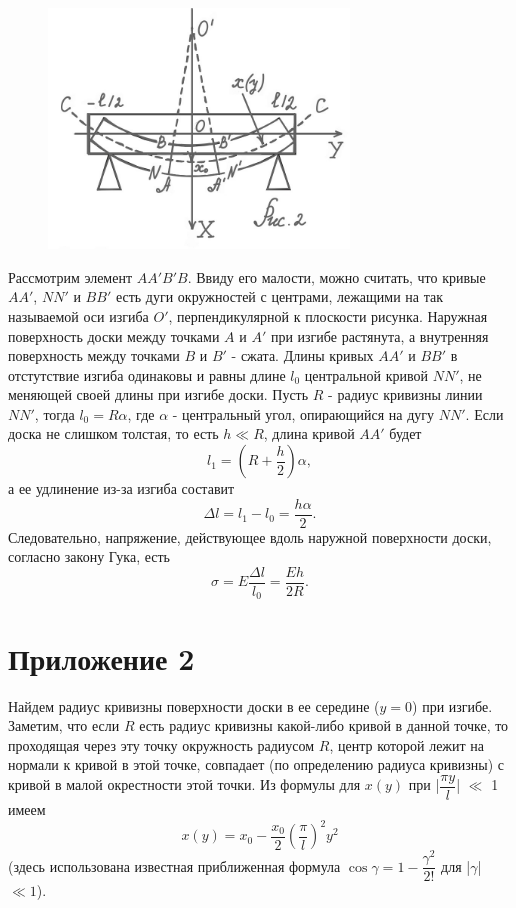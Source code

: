 \documentclass[a4paper,12pt]{article} %
\begin{document}
\begin{figure}
\includegraphics[width=8cm]{pictures/2.PNG}
\label{fig:image}
\end{figure}
Рассмотрим элемент $AA'B'B$. Ввиду его малости, можно считать, что кривые $AA'$, $NN'$ и $BB'$ есть дуги окружностей с центрами, лежащими на так называемой оси изгиба $O'$, перпендикулярной к плоскости рисунка. Наружная поверхность доски между точками $A$ и $A'$ при изгибе растянута, а внутренняя поверхность между точками $B$ и $B'$ - сжата. Длины кривых $AA'$ и $BB'$ в отстутствие изгиба одинаковы и равны длине $l_0$ центральной кривой $NN'$, не меняющей своей длины при изгибе доски. Пусть $R$ - радиус кривизны линии $NN'$, тогда $l_0 = R\alpha$, где $\alpha$ - центральный угол, опирающийся на дугу $NN'$. Если доска не слишком толстая, то есть $h \ll R$, длина кривой $AA'$ будет $$l_1 = \left(R + \dfrac{h}{2}\right)\alpha,$$ а ее удлинение из-за изгиба составит $$\Delta l = l_1 - l_0 = \dfrac{h\alpha}{2}.$$ Следовательно, напряжение, действующее вдоль наружной поверхности доски, согласно закону Гука, есть $$\sigma = E\dfrac{\Delta l}{l_0} = \dfrac{Eh}{2R}.$$

\section*{Приложение 2}

Найдем радиус кривизны поверхности доски в ее середине ($y = 0$) при изгибе. Заметим, что если $R$ есть радиус кривизны какой-либо кривой в данной точке, то проходящая через эту точку окружность радиусом $R$, центр которой лежит на нормали к кривой в этой точке, совпадает (по определению радиуса кривизны) с кривой в малой окрестности этой точки. Из формулы для $x(y)$ при |$\dfrac{\pi y}{l}$| $\ll$ 1 имеем $$x(y) = x_0 - \dfrac{x_0}{2}\left(\dfrac{\pi}{l}\right)^2y^2$$ (здесь использована известная приближенная формула $\cos{\gamma} = 1 - \dfrac{\gamma^2}{2!}$ для |$\gamma$| $\ll 1$). 
\end{document}
